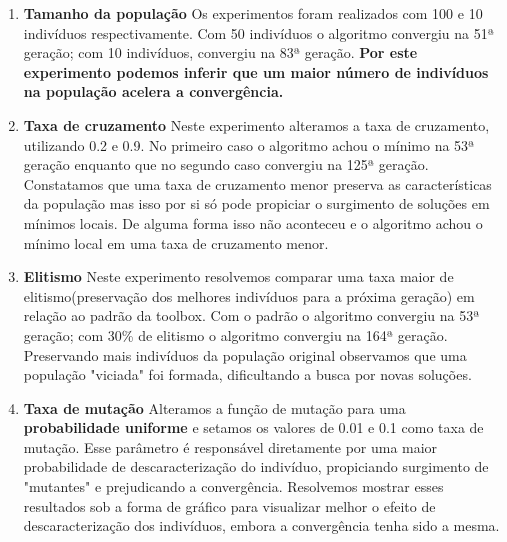 \documentclass[a4paper, 12pt]{article}
\begin{document}
		\begin{enumerate}[label=\alph*)]
			\item \textbf{Tamanho da população}
			Os experimentos foram realizados com 100 e 10 indivíduos respectivamente.  Com 50 indivíduos o algoritmo convergiu na 51ª geração;  com 10 indivíduos, convergiu na 83ª geração.  \textbf{Por este experimento podemos inferir que um maior número de indivíduos na população acelera a convergência.}
			\item \textbf{Taxa de cruzamento}
			Neste experimento alteramos a taxa de cruzamento, utilizando 0.2 e 0.9.  No primeiro caso o algoritmo achou o mínimo na 53ª geração enquanto que no segundo caso convergiu na 125ª geração.  Constatamos que uma taxa de cruzamento menor preserva as características da população mas isso por si só pode propiciar o surgimento de soluções em mínimos locais.  De alguma forma isso não aconteceu e o algoritmo achou o mínimo local em uma taxa de cruzamento menor.
			\item \textbf{Elitismo}
			Neste experimento resolvemos comparar uma taxa maior de elitismo(preservação dos melhores indivíduos para a próxima geração) em relação ao padrão da toolbox.  Com o padrão o algoritmo convergiu na 53ª geração;  com 30\% de elitismo o algoritmo convergiu na 164ª geração.  Preservando mais indivíduos da população original observamos que uma população "viciada" foi formada, dificultando a busca por novas soluções.
			\item \textbf{Taxa de mutação}
			Alteramos a função de mutação para uma \textbf{probabilidade uniforme} e setamos os valores de 0.01 e 0.1 como taxa de mutação.  Esse parâmetro é responsável diretamente por uma maior probabilidade de descaracterização do indivíduo, propiciando surgimento de "mutantes" e prejudicando a convergência.  Resolvemos mostrar esses resultados sob a forma de gráfico para visualizar melhor o efeito de descaracterização dos indivíduos, embora a convergência tenha sido a mesma.
				\begin{figure}[H]
					\centering
\end{figure}
\end{enumerate}
\end{document}
